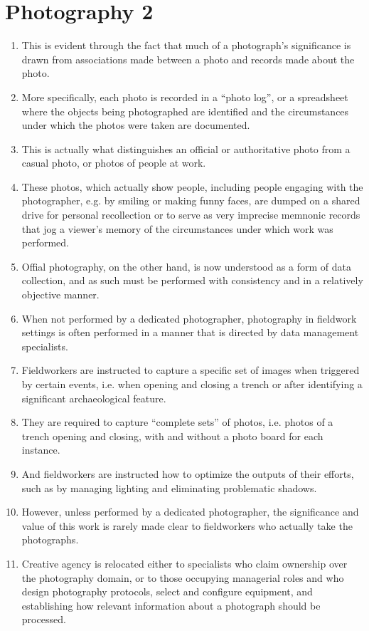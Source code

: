 \documentclass[12pt]{article}
\begin{document}
\section{Photography 2}
\begin{enumerate}
  \item This is evident through the fact that much of a photograph’s significance is drawn from associations made between a photo and records made about the photo.
  \item More specifically, each photo is recorded in a ``photo log'', or a spreadsheet where the objects being photographed are identified and the circumstances under which the photos were taken are documented.
  \item This is actually what distinguishes an official or authoritative photo from a casual photo, or photos of people at work.
  \item These photos, which actually show people, including people engaging with the photographer, e.g. by smiling or making funny faces, are dumped on a shared drive for personal recollection or to serve as very imprecise memnonic records that jog a viewer's memory of the circumstances under which work was performed.
  \item Offial photography, on the other hand, is now understood as a form of data collection, and as such must be performed with consistency and in a relatively objective manner.
  \item When not performed by a dedicated photographer, photography in fieldwork settings is often performed in a manner that is directed by data management specialists.
  \item Fieldworkers are instructed to capture a specific set of images when triggered by certain events, i.e. when opening and closing a trench or after identifying a significant archaeological feature.
  \item They are required to capture ``complete sets'' of photos, i.e. photos of a trench opening and closing, with and without a photo board for each instance.
  \item And fieldworkers are instructed how to optimize the outputs of their efforts, such as by managing lighting and eliminating problematic shadows.
  \item However, unless performed by a dedicated photographer, the significance and value of this work is rarely made clear to fieldworkers who actually take the photographs.
  \item Creative agency is relocated either to specialists who claim ownership over the photography domain, or to those occupying managerial roles and who design photography protocols, select and configure equipment, and establishing how relevant information about a photograph should be processed.

\end{enumerate}
\end{document}
